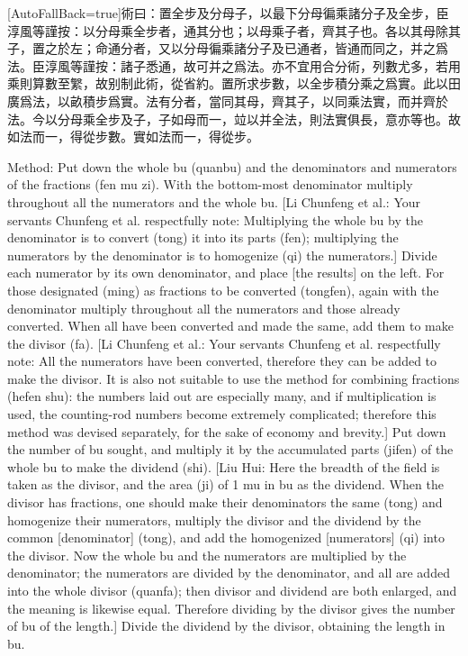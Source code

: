 \documentclass[11pt]{article}
\newcommand{\zhsmall}{\footnotesize\color{black!70}}
\newcommand{\unitlabel}[1]{\marginpar{\raggedleft\tiny\color{gray}#1}}
\newenvironment{unitzh}{\par\CJKfontspec{Noto Serif CJK SC}[AutoFallBack=true]\large\linespread{1.25}\selectfont}{\par}
\newenvironment{uniten}{\par\small\color{black!85}}{\par\medskip}
\begin{document}
\begin{unitzh}\unitlabel{jiuzhang-014.4}術曰：置全步及分母子，以最下分母徧乘諸分子及全步，{\zhsmall 臣淳風等謹按：以分母乘全步者，通其分也；以母乘子者，齊其子也。}各以其母除其子，置之於左；命通分者，又以分母徧乘諸分子及已通者，皆通而同之，并之爲法。{\zhsmall 臣淳風等謹按：諸子悉通，故可并之爲法。亦不宜用合分術，列數尤多，若用乘則算數至䌓，故别制此術，從省約。}置所求步數，以全步積分乘之爲實。{\zhsmall 此以田廣爲法，以畝積步爲實。法有分者，當同其母，齊其子，以同乘法實，而并齊於法。今以分母乘全步及子，子如母而一，竝以并全法，則法實俱長，意亦等也。故如法而一，得從步數。}實如法而一，得從步。\end{unitzh}
\begin{uniten}Method: Put down the whole bu (quanbu) and the denominators and numerators of the fractions (fen mu zi). With the bottom-most denominator multiply throughout all the numerators and the whole bu. [Li Chunfeng et al.: Your servants Chunfeng et al. respectfully note: Multiplying the whole bu by the denominator is to convert (tong) it into its parts (fen); multiplying the numerators by the denominator is to homogenize (qi) the numerators.] Divide each numerator by its own denominator, and place [the results] on the left. For those designated (ming) as fractions to be converted (tongfen), again with the denominator multiply throughout all the numerators and those already converted. When all have been converted and made the same, add them to make the divisor (fa). [Li Chunfeng et al.: Your servants Chunfeng et al. respectfully note: All the numerators have been converted, therefore they can be added to make the divisor. It is also not suitable to use the method for combining fractions (hefen shu): the numbers laid out are especially many, and if multiplication is used, the counting-rod numbers become extremely complicated; therefore this method was devised separately, for the sake of economy and brevity.] Put down the number of bu sought, and multiply it by the accumulated parts (jifen) of the whole bu to make the dividend (shi). [Liu Hui: Here the breadth of the field is taken as the divisor, and the area (ji) of 1 mu in bu as the dividend. When the divisor has fractions, one should make their denominators the same (tong) and homogenize their numerators, multiply the divisor and the dividend by the common [denominator] (tong), and add the homogenized [numerators] (qi) into the divisor. Now the whole bu and the numerators are multiplied by the denominator; the numerators are divided by the denominator, and all are added into the whole divisor (quanfa); then divisor and dividend are both enlarged, and the meaning is likewise equal. Therefore dividing by the divisor gives the number of bu of the length.] Divide the dividend by the divisor, obtaining the length in bu.\end{uniten}
\end{document}
